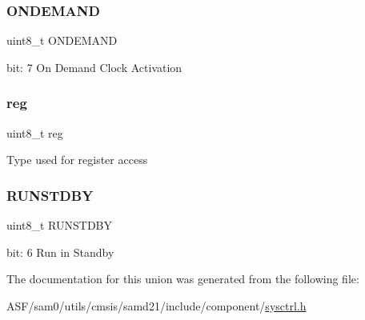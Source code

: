 \subsubsection{\texorpdfstring{ONDEMAND}{ONDEMAND}}
{\footnotesize\ttfamily uint8\+\_\+t O\+N\+D\+E\+M\+A\+ND}

bit\+: 7 On Demand Clock Activation \mbox{\label{union_s_y_s_c_t_r_l___d_p_l_l_c_t_r_l_a___type_a9428adc9af4653a2050e2536b55dec8d}} 
\subsubsection{\texorpdfstring{reg}{reg}}
{\footnotesize\ttfamily uint8\+\_\+t reg}

Type used for register access \mbox{\label{union_s_y_s_c_t_r_l___d_p_l_l_c_t_r_l_a___type_aa24338c5cacc63e3b77adf2dc0938ff6}} 
\subsubsection{\texorpdfstring{RUNSTDBY}{RUNSTDBY}}
{\footnotesize\ttfamily uint8\+\_\+t R\+U\+N\+S\+T\+D\+BY}

bit\+: 6 Run in Standby 

The documentation for this union was generated from the following file\+:\begin{DoxyCompactItemize}
\item 
A\+S\+F/sam0/utils/cmsis/samd21/include/component/\mbox{\hyperlink{component_2sysctrl_8h}{sysctrl.\+h}}\end{DoxyCompactItemize}

